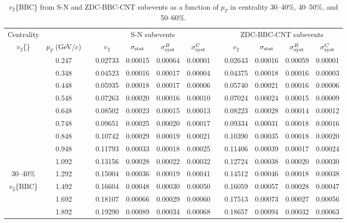 \documentclass[aps,prc,superscriptaddress,showpacs,floatfix,twocolumn]{revtex4}
\newcommand \gevc{GeV/$c$\xspace}
\newcommand \pt{\mbox{$p_T$}\xspace}
\begin{document}
\begin{table}[htbp]
\caption{\label{tab:table_v2bbc_cent30-60}
$v_2$\{BBC\} from S-N and ZDC-BBC-CNT subevents as a function of \pt in centrality 
30--40\%, 40--50\%, and 50--60\%.
}
\begingroup \squeezetable
\begin{ruledtabular} \begin{tabular}{c|ccccccccccc}
Centrality
 & & & \multicolumn{4}{c}{S-N subevents} & & \multicolumn{4}{c}{ZDC-BBC-CNT subevents} \\ 
$v_2$\{\}
 &$\pt$ (\gevc) & & $v_2$ & $\sigma_{\rm stat}$ & $\sigma_{\rm syst}^B$ & $\sigma_{\rm syst}^C$ 
& & $v_2$ & $\sigma_{\rm stat}$ & $\sigma_{\rm syst}^B$ & $\sigma_{\rm syst}^C$ \\ 
\hline
 & 0.247 && 0.02733 & 0.00015 & 0.00064 & 0.00001 & & 0.02643 & 0.00016 & 0.00059 & 0.00001 \\ 
 & 0.348 && 0.04523 & 0.00016 & 0.00017 & 0.00004 & & 0.04375 & 0.00018 & 0.00016 & 0.00003 \\ 
 & 0.448 && 0.05935 & 0.00018 & 0.00017 & 0.00006 & & 0.05740 & 0.00021 & 0.00016 & 0.00006 \\ 
 & 0.548 && 0.07263 & 0.00020 & 0.00016 & 0.00010 & & 0.07024 & 0.00024 & 0.00015 & 0.00009 \\ 
 & 0.648 && 0.08502 & 0.00023 & 0.00015 & 0.00013 & & 0.08223 & 0.00028 & 0.00014 & 0.00012 \\ 
 & 0.748 && 0.09651 & 0.00025 & 0.00020 & 0.00017 & & 0.09334 & 0.00031 & 0.00018 & 0.00016 \\ 
 & 0.848 && 0.10742 & 0.00029 & 0.00019 & 0.00021 & & 0.10390 & 0.00035 & 0.00018 & 0.00020 \\ 
 & 0.948 && 0.11793 & 0.00033 & 0.00018 & 0.00025 & & 0.11406 & 0.00039 & 0.00017 & 0.00024 \\ 
 & 1.092 && 0.13156 & 0.00028 & 0.00022 & 0.00032 & & 0.12724 & 0.00038 & 0.00020 & 0.00030 \\ 
30--40\%
 & 1.292 && 0.15004 & 0.00036 & 0.00019 & 0.00041 & & 0.14512 & 0.00046 & 0.00018 & 0.00038 \\ 
$v_2$\{BBC\}
 & 1.492 && 0.16604 & 0.00048 & 0.00030 & 0.00050 & & 0.16059 & 0.00057 & 0.00028 & 0.00047 \\ 
 & 1.692 && 0.18107 & 0.00066 & 0.00029 & 0.00060 & & 0.17513 & 0.00073 & 0.00027 & 0.00056 \\ 
 & 1.892 && 0.19290 & 0.00089 & 0.00034 & 0.00068 & & 0.18657 & 0.00094 & 0.00032 & 0.00063 \\ 

\end{tabular}
\end{ruledtabular}
\end{table}
\end{document}

